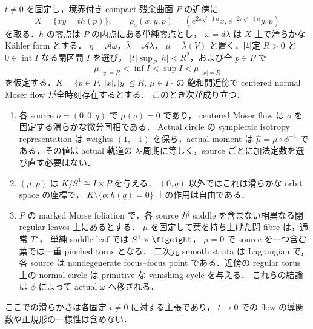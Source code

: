 \begin{lemma}
\label{ke:source-reduction-pinched-fiber}
$t\ne0$ を固定し，境界付き compact 残余曲面 $P$ の近傍に
\[
 X=\{xy=t h(p)\},\qquad
 \rho_a(x,y,p)=(e^{2\pi\sqrt{-1}a}x,e^{-2\pi\sqrt{-1}a}y,p)
\]
を取る．$h$ の零点は $P$ の内点にある単純零点とし，
$\omega=d\lambda$ は $X$ 上で滑らかな K\"ahler form とする．
$\eta=\mathcal A\omega$，$\bar\lambda=\mathcal A\lambda$，
$\mu=\bar\lambda(V)$ と置く．固定 $R>0$ と
$0\in\operatorname{int}I$ なる閉区間 $I$ を選び，
$|t|\sup_P|h|<R^2$，および全 $p\in P$ で
\[
 \left.\mu\right|_{|y|=R}<\inf I<\sup I
       <\left.\mu\right|_{|x|=R}
\]
を仮定する．$K=\{p\in P,\ |x|,|y|\le R,\ \mu\in I\}$ の
飽和開近傍で centered normal Moser flow が全時刻存在するとする．
このとき次が成り立つ．
\begin{enumerate}
 \item 各 source $o=(0,0,q)$ で $\mu(o)=0$ であり，
 centered Moser flow は $o$ を固定する滑らかな微分同相である．
 Actual circle の symplectic isotropy representation は weights $(1,-1)$ を保ち，actual moment は
 $\widehat\mu=\mu\circ\phi^{-1}$ である．その値は actual 軌道の
 $\lambda$-周期に等しく，source ごとに加法定数を選び直す必要はない．
 \item $(\mu,p)$ は $K/S^1\cong I\times P$ を与える．
 $(0,q)$ 以外ではこれは滑らかな orbit space の座標で，
 $K\setminus\{o:h(q)=0\}$ 上の作用は自由である．
 \item $P$ の marked Morse foliation で，各 source が
 saddle を含まない相異なる閉 regular leaves 上にあるとする．
 $\mu$ を固定して葉を持ち上げた閉 fibre は，通常 $T^2$，
 単純 saddle leaf では $S^1\times\figeight$，
 $\mu=0$ で source を一つ含む葉では一重 pinched torus となる．
 二次元 smooth strata は Lagrangian で，各 source は
 nondegenerate focus--focus point である．近傍の regular torus 上の
 normal circle は primitive な vanishing cycle を与える．
 これらの結論は $\phi$ によって actual $\omega$ へ移される．
\end{enumerate}
ここでの滑らかさは各固定 $t\ne0$ に対する主張であり，
$t\to0$ での flow の導関数や正規形の一様性は含めない．
\end{lemma}
